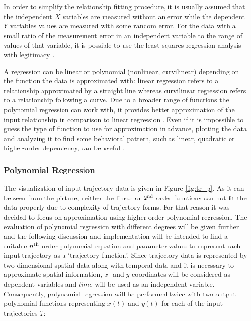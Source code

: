 In order to simplify the relationship fitting procedure, it is usually assumed that the independent $X$ variables are measured without an error while the dependent $Y$ variables values are measured with some random error. For the data with a small ratio of the measurement error in an independent variable to the range of values of that variable, it is possible to use the least squares regression analysis with legitimacy \cite{article:behav_form_extr}.

A regression can be linear or polynomial (nonlinear, curvilinear) depending on the function the data is approximated with: linear regression refers to a relationship approximated by a straight line whereas curvilinear regression refers to a relationship following a curve. Due to a broader range of functions the polynomial regression can work with, it provides better approximation of the input relationship in comparison to linear regression \cite{online:intro_lr_pr}. Even if it is impossible to guess the type of function to use for approximation in advance, plotting the data and analyzing it to find some behavioral pattern, such as linear, quadratic or higher-order dependency, can be useful \cite{article:behav_form_extr}. 

\subsubsection{Polynomial Regression}

The visualization of input trajectory data is given in Figure \ref{fig:tr_p}. As it can be seen from the picture, neither the linear or $2\textsuperscript{nd}$ order functions can not fit the data properly due to complexity of trajectory forms. For that reason it was decided to focus on approximation using higher-order polynomial regression. The evaluation of polynomial regression with different degrees will be given further and the following discussion and implementation will be intended to find a suitable $n\textsuperscript{th}$ order polynomial equation and parameter values to represent each input trajectory as a `trajectory function'. Since trajectory data is represented by two-dimensional spatial data along with temporal data and it is necessary to approximate spatial information, $x$- and $y$-coordinates will be considered as dependent variables and $time$ will be used as an independent variable. Consequently, polynomial regression will be performed twice with two output polynomial functions representing $x(t)$ and $y(t)$ for each of the input trajectories $T$:

